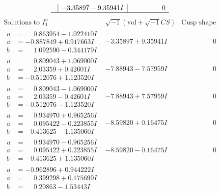 \documentclass[1p]{elsarticle_modified}
\theoremstyle{definition}
\newcommand{\I}{\sqrt{-1}}
\begin{document}
$$\begin{array}{c|c|c}
 & -3.35897 - 9.35941 I & \phantom{-0.000000 } 0\\
 \hline 
 \end{array}$$\newpage$$\begin{array}{c|c|c}  
\text{Solutions to }I^u_{1}& \I (\text{vol} + \sqrt{-1}CS) & \text{Cusp shape}\\
 \hline 
\begin{aligned}
u &= \phantom{-}0.863954 - 1.022410 I \\
a &= -0.887849 + 0.917663 I \\
b &= \phantom{-}1.092590 - 0.344179 I\end{aligned}
 & -3.35897 + 9.35941 I & \phantom{-0.000000 } 0 \\ \hline\begin{aligned}
u &= \phantom{-}0.809043 + 1.069000 I \\
a &= \phantom{-}2.03359 + 0.42601 I \\
b &= -0.512076 + 1.123520 I\end{aligned}
 & -7.88943 - 7.57959 I & \phantom{-0.000000 } 0 \\ \hline\begin{aligned}
u &= \phantom{-}0.809043 - 1.069000 I \\
a &= \phantom{-}2.03359 - 0.42601 I \\
b &= -0.512076 - 1.123520 I\end{aligned}
 & -7.88943 + 7.57959 I & \phantom{-0.000000 } 0 \\ \hline\begin{aligned}
u &= \phantom{-}0.934970 + 0.965256 I \\
a &= \phantom{-}0.095422 - 0.223855 I \\
b &= -0.413625 - 1.135060 I\end{aligned}
 & -8.59820 + 0.16475 I & \phantom{-0.000000 } 0 \\ \hline\begin{aligned}
u &= \phantom{-}0.934970 - 0.965256 I \\
a &= \phantom{-}0.095422 + 0.223855 I \\
b &= -0.413625 + 1.135060 I\end{aligned}
 & -8.59820 - 0.16475 I & \phantom{-0.000000 } 0 \\ \hline\begin{aligned}
u &= -0.962896 + 0.944222 I \\
a &= \phantom{-}0.399298 + 0.175699 I \\
b &= \phantom{-}0.20863 - 1.53443 I\end{aligned}

\end{array}$$
\end{document}
